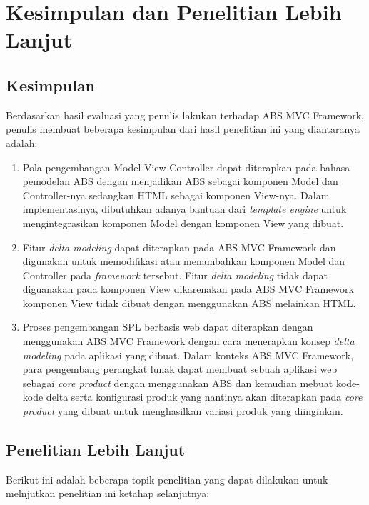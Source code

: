\chapter{Kesimpulan dan Penelitian Lebih Lanjut}

\section{Kesimpulan}
Berdasarkan hasil evaluasi yang penulis lakukan terhadap ABS MVC Framework, penulis membuat beberapa kesimpulan dari hasil penelitian ini yang diantaranya adalah:

\begin{enumerate}
    \item Pola pengembangan Model-View-Controller dapat diterapkan pada bahasa pemodelan ABS dengan menjadikan ABS sebagai komponen Model dan Controller-nya sedangkan HTML sebagai komponen View-nya. Dalam implementasinya, dibutuhkan adanya bantuan dari \textit{template engine} untuk mengintegrasikan komponen Model dengan komponen View yang dibuat.
    \item Fitur \textit{delta modeling} dapat diterapkan pada ABS MVC Framework dan digunakan untuk memodifikasi atau menambahkan komponen Model dan Controller pada \textit{framework} tersebut. Fitur \textit{delta modeling} tidak dapat diguanakan pada komponen View dikarenakan pada ABS MVC Framework komponen View tidak dibuat dengan menggunakan ABS melainkan HTML.
    \item Proses pengembangan SPL berbasis web dapat diterapkan dengan menggunakan ABS MVC Framework dengan cara menerapkan konsep \textit{delta modeling} pada aplikasi yang dibuat. Dalam konteks ABS MVC Framework, para pengembang perangkat lunak dapat membuat sebuah aplikasi web sebagai \textit{core product} dengan menggunakan ABS dan kemudian mebuat kode-kode delta serta konfigurasi produk yang nantinya akan diterapkan pada \textit{core product} yang dibuat untuk menghasilkan variasi produk yang diinginkan.
\end{enumerate}

\section{Penelitian Lebih Lanjut}
Berikut ini adalah beberapa topik penelitian yang dapat dilakukan untuk melnjutkan penelitian ini ketahap selanjutnya:

